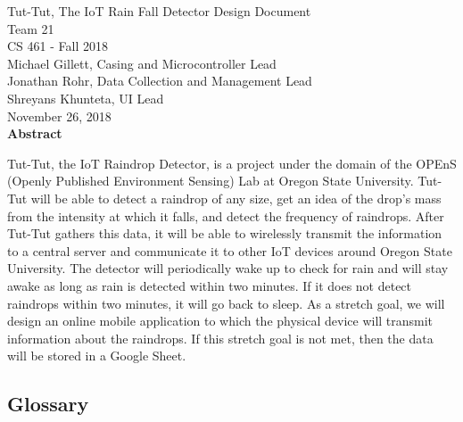 \documentclass[letterpaper,10pt,draftclsnofoot,onecolumn]{article}
\begin{document}
\begin{titlepage}
\vspace*{\fill}
\begin{center}
{\Large Tut-Tut, The IoT Rain Fall Detector Design Document}
\\[0.3cm]

{\large Team 21}
\\[0.3cm]

{\large CS 461 - Fall 2018}
\\[0.3cm]

{\large Michael Gillett, Casing and Microcontroller Lead}
\\[0.3cm]
{\large Jonathan Rohr, Data Collection and Management Lead}
\\[0.3cm]
{\large Shreyans Khunteta, UI Lead}
\\[0.3cm]

{\large November 26, 2018}
\\[1cm]

{\Large \textbf{Abstract}}
\end{center}
Tut-Tut, the IoT Raindrop Detector, is a project under the domain of the OPEnS (Openly Published Environment Sensing) Lab at Oregon State University. Tut-Tut will be able to detect a raindrop of any size, get an idea of the drop's mass from the intensity at which it falls, and detect the frequency of raindrops. After Tut-Tut gathers this data, it will be able to wirelessly transmit the information to a central server and communicate it to other IoT devices around Oregon State University. The detector will periodically wake up to check for rain and will stay awake as long as rain is detected within two minutes. If it does not detect raindrops within two minutes, it will go back to sleep. As a stretch goal, we will design an online mobile application to which the physical device will transmit information about the raindrops. If this stretch goal is not met, then the data will be stored in a Google Sheet.
\vspace*{\fill}
\end{titlepage}

\begin{center}
\section*{Glossary}
\end{center}
\end{document}
